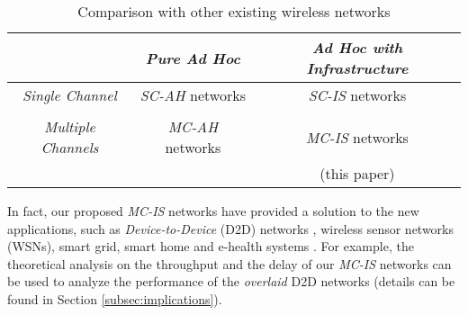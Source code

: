 \documentclass[10pt,journal]{IEEEtran}
\begin{document}
\begin{table}[t!]
\centering
\renewcommand{\arraystretch}{1.1}
\caption{Comparison with other existing wireless networks}
\label{tab:networks}
\begin{tabular}{|c|c|c|}
\hline
 &\textit{Pure Ad Hoc} & \textit{Ad Hoc with Infrastructure} \\
\hline
\hline
 \textit{Single Channel} & \textit{SC-AH} networks  & \textit{SC-IS} networks \\
& \cite{Gupta:Kumar,gamal:2004,gamal:TIT2006} & \cite{bliu:infocom2003,panli:jsac09,Kozat:mobicom2003,Zemlianov:jsac05,XWang:TC2010,bliu:mobihoc2007,panli:infocom10,Xie:ICC12} \\ 
\hline
 \textit{Multiple Channels} & \textit{MC-AH} networks & \textit{MC-IS} networks \\
 &  \cite{Raniwala:infocom2005,So:mobihoc04,Bahl:mobicom2004,Draves:mobicom2004,Kyasanur:mobicom2005,hndai:infocom2008} & (this paper)\\ 
 \hline
\end{tabular}
\end{table}

In fact, our proposed \emph{MC-IS} networks have provided a solution to the new applications, such as \emph{Device-to-Device} (D2D) networks \cite{Asadi:CST14}, wireless sensor networks (WSNs), smart grid, smart home and e-health systems \cite{YZhang:IEEENet12,YYan:TCST13}. For example, the theoretical analysis on the throughput and the delay of our \emph{MC-IS} networks can be used to analyze the performance of the \emph{overlaid} D2D networks (details can be found in Section \ref{subsec:implications}). 
\end{document}

